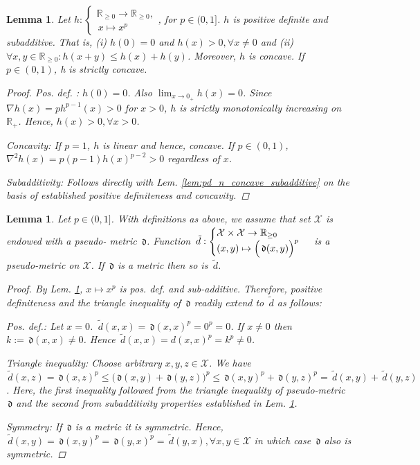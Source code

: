 \documentclass{article} %
\newtheorem{lem}[thm]{Lemma}
\theoremstyle{definition}
\theoremstyle{remark}
\newcommand{\Real}{\mathbb R}
\newcommand{\inspace}{\ensuremath{ \mathcal X}}
\newcommand{\metric}{\, \mathfrak{d}} %
\newcommand{\metricp}{\,  \tilde {d}} %
\begin{document}
\begin{lem} \label{lem:x2p_pdNsubadd}
 Let $h: \begin{cases} \Real_{\geq 0} \to \Real_{\geq 0},\\ \, x \mapsto x^p\end{cases}$, for $p \in (0,1] $. $h$ is positive definite and subadditive. 
 That is, (i) $h(0) = 0 $ and  $h(x) > 0, \forall x \neq 0$ and (ii) $\forall x,y \in \Real_{\geq 0}: h(x+y) \leq h(x) + h(y)  $.
 Moreover, $h$ is concave. If $p \in (0,1)$, h is strictly concave. 
 
\begin{proof}
\textit{Pos. def. :} $h(0) = 0$.  Also $\lim_{x \to 0_+} h(x) =0$. Since $\nabla h (x) = p h^{p-1}(x) >0 $ for $x >0$, $h$ is strictly monotonically increasing on $\Real_+$. Hence, $h(x) > 0, \forall x >0$. 

\textit{Concavity:} If $p =1$, $h$ is linear and hence, concave. If $p \in (0,1)$, $\nabla^2 h(x) = p (p-1) h(x)^{p-2} > 0$ regardless of $x$.

\textit{Subadditivity:} Follows directly with Lem. \ref{lem:pd_n_concave_subadditive} on the basis of established positive definiteness and concavity.
\end{proof}
\end{lem}



\begin{lem}\label{lem:hoeldererror_metric}
Let $p \in (0,1]$.
With definitions as above, we assume that set $\inspace$ is endowed with a pseudo- metric $\metric$. Function
$\metricp: \begin{cases} \inspace \times \inspace \to \Real_{\geq 0} \\ (x,y) \mapsto \Bigl(\metric(x,y)\Bigr)^p \end{cases}$ is a pseudo-metric on $\inspace$.
If $\metric$ is a metric then so is $\metricp$.
\begin{proof}
 By Lem. \ref{lem:x2p_pdNsubadd}, $x\mapsto x^p$ is pos. def. and sub-additive. Therefore, positive definiteness and the triangle inequality of $\metric$ readily extend to $\metricp$ as follows: 

\textit{Pos. def.:}
Let $x=0$. $\metricp(x,x) = \metric(x,x)^p = 0^p = 0$. If $x \neq 0$ then $k :=\metric(x,x) \neq 0$. Hence   $\metricp(x,x) = d(x,x)^p = k^p \neq 0$.

\textit{Triangle inequality:}
Choose arbitrary $x,y,z \in \inspace $. We have $\metricp(x,z) = \metric(x,z)^p \leq (\metric(x,y) + \metric(y,z) \bigr)^p \leq \metric(x,y)^p + \metric(y,z)^p = \metricp(x,y) + \metricp(y,z)$. Here, the first inequality followed from the triangle inequality of pseudo-metric $\metric$ and the second from subadditivity properties established in Lem. \ref{lem:x2p_pdNsubadd}.

\textit{Symmetry:} If $\metric$ is a metric it is symmetric. Hence, $\metricp(x,y) = \metric(x,y)^p = \metric(y,x)^p = \metricp(y,x), \forall x,y \in \inspace $ in which case $\metric$ also is symmetric.
\end{proof}
\end{lem}
\end{document}
